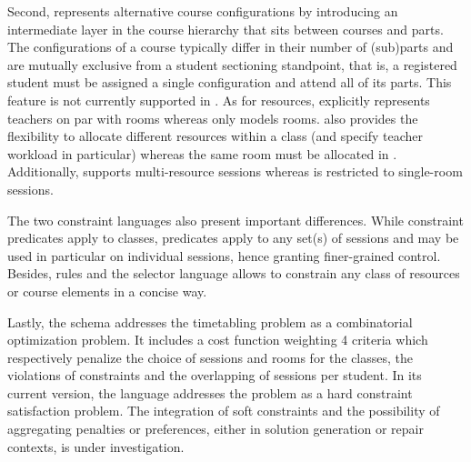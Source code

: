 Second, 
{\ITC} represents alternative course configurations
by introducing an intermediate layer in the course hierarchy 
that sits between courses and parts.
The configurations of a course typically differ in their number of (sub)parts
and are mutually exclusive from a student sectioning standpoint, that is, 
a registered student must be assigned a single configuration and attend all of its parts.
This feature is not currently supported in {\UTP}.
As for resources, {\UTP} explicitly represents teachers on par with rooms %
whereas {\ITC} only models rooms.
{\UTP} also provides the flexibility to allocate different resources within a class 
(and specify teacher workload in particular) %
whereas the same room must be allocated in {\ITC}.
Additionally, {\UTP} supports multi-resource sessions whereas {\ITC} is restricted to single-room sessions.

The two constraint languages also present important differences.
While {\ITC} constraint predicates apply to classes,
{\UTP} predicates apply to any set(s) of sessions
and may be used in particular on individual sessions, hence granting finer-grained control.
Besides, {\UTP} rules and the selector language allows to constrain any class of resources or course elements in a concise way.

Lastly, the {\ITC} schema addresses the timetabling problem as a combinatorial optimization problem.
It includes a cost function weighting 4 criteria which respectively penalize the choice of sessions and rooms for the classes, the violations of constraints and the overlapping of sessions per student.
In its current version, the {\UTP} language addresses the problem as a hard constraint satisfaction problem.
The integration of soft constraints and the possibility of aggregating penalties or preferences, either in solution generation or repair contexts, is under investigation.



